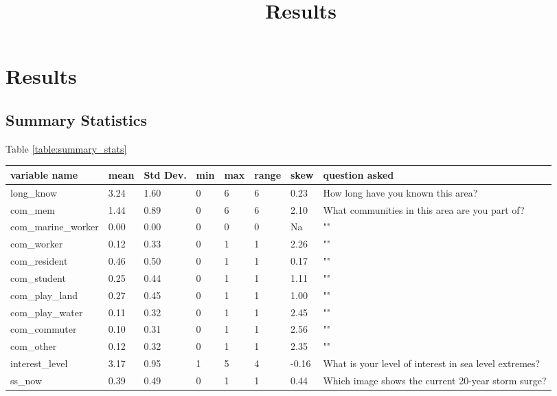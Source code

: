 

\title{Results}

\chapter{Results}

\section{Summary Statistics }


Table \ref{table:summary_stats}

\begin{center}
\begin{table}[!ht]
    \centering
    \begin{tabular}{|l|l|l|l|l|l|l|l|}
    \hline
        variable name & mean & Std Dev. & min & max & range & skew & question asked \\ \hline
        long\_know & 3.24 & 1.60 & 0 & 6 & 6 & 0.23 & How long have you known this area? \\ \hline
        com\_mem & 1.44 & 0.89 & 0 & 6 & 6 & 2.10 & What communities in this area are you part of? \\ \hline
        com\_marine\_worker & 0.00 & 0.00 & 0 & 0 & 0 & Na & "" \\ \hline
        com\_worker & 0.12 & 0.33 & 0 & 1 & 1 & 2.26 & "" \\ \hline
        com\_resident & 0.46 & 0.50 & 0 & 1 & 1 & 0.17 & "" \\ \hline
        com\_student & 0.25 & 0.44 & 0 & 1 & 1 & 1.11 & "" \\ \hline
        com\_play\_land & 0.27 & 0.45 & 0 & 1 & 1 & 1.00 & "" \\ \hline
        com\_play\_water & 0.11 & 0.32 & 0 & 1 & 1 & 2.45 & "" \\ \hline
        com\_commuter & 0.10 & 0.31 & 0 & 1 & 1 & 2.56 & "" \\ \hline
        com\_other & 0.12 & 0.32 & 0 & 1 & 1 & 2.35 & "" \\ \hline
        interest\_level & 3.17 & 0.95 & 1 & 5 & 4 & -0.16 & What is your level of interest in sea level extremes? \\ \hline
        ss\_now & 0.39 & 0.49 & 0 & 1 & 1 & 0.44 & Which image shows the current 20-year storm surge? \\ \hline

\end{tabular}
\end{table}
\end{center}
